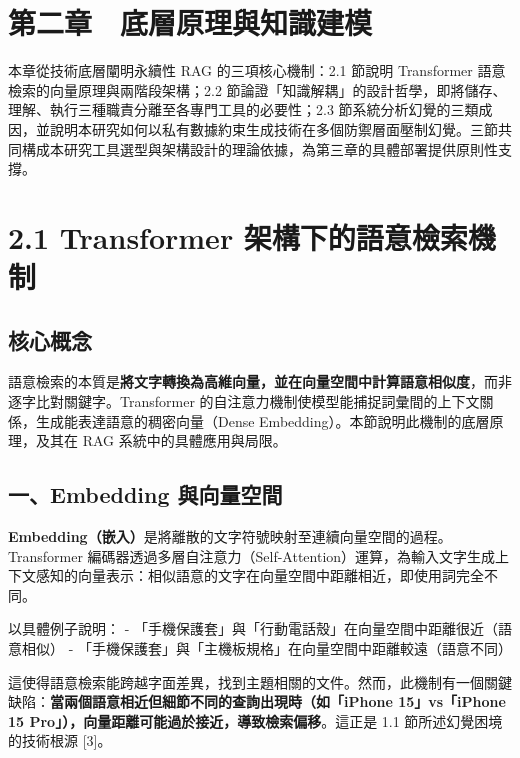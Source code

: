\chapter{第二章　底層原理與知識建模}\label{ux7b2cux4e8cux7ae0-ux5e95ux5c64ux539fux7406ux8207ux77e5ux8b58ux5efaux6a21}

本章從技術底層闡明永續性 RAG 的三項核心機制：2.1 節說明 Transformer
語意檢索的向量原理與兩階段架構；2.2
節論證「知識解耦」的設計哲學，即將儲存、理解、執行三種職責分離至各專門工具的必要性；2.3
節系統分析幻覺的三類成因，並說明本研究如何以私有數據約束生成技術在多個防禦層面壓制幻覺。三節共同構成本研究工具選型與架構設計的理論依據，為第三章的具體部署提供原則性支撐。

\chapter{2.1 Transformer
架構下的語意檢索機制}\label{transformer-ux67b6ux69cbux4e0bux7684ux8a9eux610fux6aa2ux7d22ux6a5fux5236}

\section{核心概念}\label{ux6838ux5fc3ux6982ux5ff5}

語意檢索的本質是\textbf{將文字轉換為高維向量，並在向量空間中計算語意相似度}，而非逐字比對關鍵字。Transformer
的自注意力機制使模型能捕捉詞彙間的上下文關係，生成能表達語意的稠密向量（Dense
Embedding）。本節說明此機制的底層原理，及其在 RAG
系統中的具體應用與局限。

\section{一、Embedding
與向量空間}\label{ux4e00embedding-ux8207ux5411ux91cfux7a7aux9593}

\textbf{Embedding（嵌入）}是將離散的文字符號映射至連續向量空間的過程。Transformer
編碼器透過多層自注意力（Self-Attention）運算，為輸入文字生成上下文感知的向量表示：相似語意的文字在向量空間中距離相近，即使用詞完全不同。

以具體例子說明： -
「手機保護套」與「行動電話殼」在向量空間中距離很近（語意相似） -
「手機保護套」與「主機板規格」在向量空間中距離較遠（語意不同）

這使得語意檢索能跨越字面差異，找到主題相關的文件。然而，此機制有一個關鍵缺陷：\textbf{當兩個語意相近但細節不同的查詢出現時（如「iPhone
15」vs「iPhone 15 Pro」），向量距離可能過於接近，導致檢索偏移}。這正是
1.1 節所述幻覺困境的技術根源 {[}3{]}。

